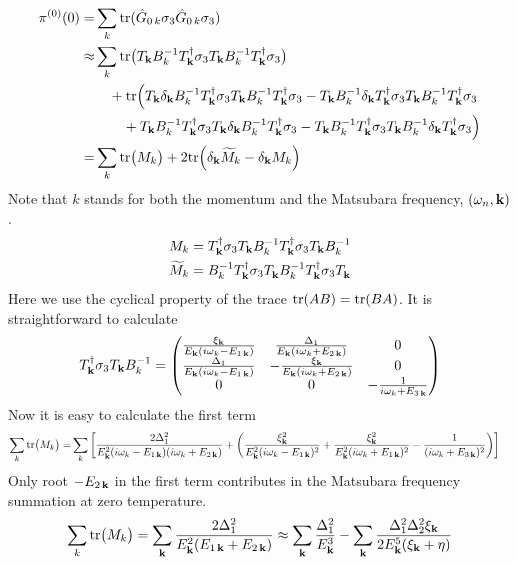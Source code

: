 \begin{equation}\label{eq:pathInt2:pi0long}
\begin{split}
\pi^{(0)}(0)=&\sum_k\text{tr}(\hat{G}_{0\,k}\sigma_3\hat{G}_{0\,k}\sigma_3)\\
	\approx&\sum_k\text{tr}\big(T_{\mathbf{k}}B_{k}^{-1}T_{\mathbf{k}}^{\dagger}\sigma_3T_{\mathbf{k}}B_{k}^{-1}T_{\mathbf{k}}^{\dagger}\sigma_3\big)\\
	&\quad+\text{tr}\Big(T_{\mathbf{k}}\delta_{\mathbf{k}}B_{k}^{-1}T_{\mathbf{k}}^{\dagger}\sigma_3T_{\mathbf{k}}B_{k}^{-1}T_{\mathbf{k}}^{\dagger}\sigma_3
	-T_{\mathbf{k}}B_{k}^{-1}\delta_{\mathbf{k}}T_{\mathbf{k}}^{\dagger}\sigma_3T_{\mathbf{k}}B_{k}^{-1}T_{\mathbf{k}}^{\dagger}\sigma_3\\
	&\qquad+T_{\mathbf{k}}B_{k}^{-1}T_{\mathbf{k}}^{\dagger}\sigma_3T_{\mathbf{k}}\delta_{\mathbf{k}}B_{k}^{-1}T_{\mathbf{k}}^{\dagger}\sigma_3
	-T_{\mathbf{k}}B_{k}^{-1}T_{\mathbf{k}}^{\dagger}\sigma_3T_{\mathbf{k}}B_{k}^{-1}\delta_{\mathbf{k}}T_{\mathbf{k}}^{\dagger}\sigma_3\Big)\\
	=&\sum_k\text{tr}\big({M}_{k}\big)+2\text{tr}\Big(\delta_{\mathbf{k}}\widetilde{M}_{k}-\delta_{\mathbf{k}}M_{k}\Big)
\end{split}
\end{equation}
Note that $k$ stands for both the momentum and  the Matsubara frequency, $(\omega_{n},\mathbf{k})$.
\begin{gather}
M_{k}=T_{\mathbf{k}}^{\dagger}\sigma_3T_{\mathbf{k}}B_{k}^{-1}T_{\mathbf{k}}^{\dagger}\sigma_3T_{\mathbf{k}}B_{k}^{-1}\\
\widetilde{M}_{k}=B_{k}^{-1}T_{\mathbf{k}}^{\dagger}\sigma_3T^{}_{\mathbf{k}}B_{k}^{-1}T_{\mathbf{k}}^{\dagger}\sigma_3T^{}_{\mathbf{k}}
\end{gather}
Here we use the cyclical  property of the trace $\text{tr}(AB)=\text{tr}(BA)$.  
It is straightforward to calculate
\begin{equation*}
T_{\mathbf{k}}^{\dagger}\sigma_3T_{\mathbf{k}}B_{k}^{-1}=
\begin{pmatrix}
{\frac{\xi_{\ensuremath{\mathbf{k}}}}{E_{\ensuremath{\mathbf{k}}}(i\omega_{k}-E_{1\,\ensuremath{\mathbf{k}}})}}&\frac{\Delta_{1}}{E_{\mathbf{k}}(i\omega_{k}+E_{2\,\mathbf{k}})}&0\\
{\frac{\Delta_{1}}{E_{\mathbf{k}}(i\omega_{k}-E_{1\,\mathbf{k}})}}&-\frac{\xi_{\mathbf{k}}}{E_{\mathbf{k}}(i\omega_{k}+E_{2\,\mathbf{k}})}&0\\
0&0&-\frac{1}{i\omega_{k}+E_{3\,\mathbf{k}}}\\
\end{pmatrix}
\end{equation*}
Now it is easy to calculate the first term
\begin{equation}
\begin{split}
\sum_k\text{tr}\big(M_{k}\big)=&
\sum_{k}\left[
\frac{2\Delta_{1}^{2}}{E_{\mathbf{k}}^{2}(i\omega_{k}-E_{1\,\mathbf{k}})(i\omega_{k}+E_{2\,\mathbf{k}})}+
\left(\frac{\xi_{\mathbf{k}}^{2}}{E_{\mathbf{k}}^{2}(i\omega_{k}-E_{1\,\mathbf{k}})^{2}}+\frac{\xi_{\mathbf{k}}^{2}}{E_{\mathbf{k}}^{2}(i\omega_{k}+E_{1\,\mathbf{k}})^{2}}
-\frac{1}{(i\omega_{k}+E_{3\,\mathbf{k}})^{2}}\right)
\right]
\end{split}
\end{equation}
Only root $-E_{2\,\mathbf{k}}$ in the first term contributes in the Matsubara frequency summation at zero temperature.
\begin{equation}\label{eq:pathInt2:pi0-1}
\sum_k\text{tr}\big(M_{k}\big)=\sum_{\mathbf{k}}\frac{2\Delta_{1}^{2}}{E_{\mathbf{k}}^{2}(E_{1\,\mathbf{k}}+E_{2\,\mathbf{k}})}
\approx\sum_{\mathbf{k}}\frac{\Delta_{1}^{2}}{E_{\mathbf{k}}^{3}}-\sum_{\mathbf{k}}\frac{\Delta_{1}^{2}\Delta_{2}^{2}\xi_{\mathbf{k}}}{2E_{\mathbf{k}}^{5}(\xi_{\mathbf{k}}+\eta)}
\end{equation}

